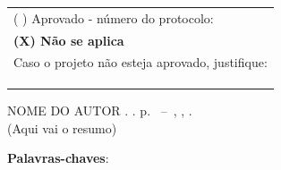 \documentclass[
	12pt,				%
	openright,			%
	oneside,				%
	a4paper,				%
	chapter=TITLE,		%
	english,			%
	french,			%
	spanish,			%
	brazil			%
	]{abntex2}
\begin{document}
\begin{center}
{\begin{tabular}{|llll|}
        \hline
        \multicolumn{4}{|l|}{( ) Aprovado - número do protocolo:} \\
        \multicolumn{4}{|l|}{\textbf{(X) Não se aplica}} \\
        \multicolumn{4}{|l|}{Caso o projeto não esteja aprovado, justifique:} \\
        \multicolumn{4}{|l|}{} \\
        \multicolumn{4}{|l|}{} \\
        \multicolumn{4}{|l|}{} \\
        \hline
    \end{tabular}}  
\end{center}
\cleardoublepage


\setlength{\absparsep}{18pt} %
\begin{resumo}
	\noindent NOME DO AUTOR {\textit\imprimirtitulo.} \imprimirdata. \pageref{LastPage} p. \imprimirtipotrabalho~--~\imprimirinstituicao, \imprimirlocal, \imprimirdata. \\[0.5cm]
	
	(Aqui vai o resumo)
	
	\textbf{Palavras-chaves}: 
\end{resumo}

%

% 
%
%  

\listoffigures*
\cleardoublepage
\end{document}
